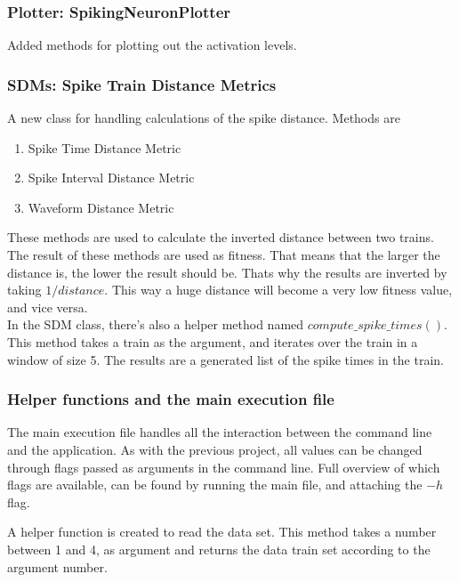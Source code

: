 \subsubsection{Plotter: SpikingNeuronPlotter}
Added methods for plotting out the activation levels. 


\subsubsection{SDMs: Spike Train Distance Metrics}
\label{sec:sdm}
A new class for handling calculations of the spike distance. Methods are 

\begin{enumerate}
	\item Spike Time Distance Metric
	\item Spike Interval Distance Metric
	\item Waveform Distance Metric
\end{enumerate}

These methods are used to calculate the inverted distance between two trains. The result of these
methods are used as fitness. That means that the larger the distance is, the lower the result should be.
Thats why the results are inverted by taking $1/distance$. This way a huge distance will become a very
low fitness value, and vice versa.  \\

In the SDM class, there's also a helper method named $compute\_spike\_times()$. This method
takes a train as the argument, and iterates over the train in a window of size 5. The results
are a generated list of the spike times in the train. 

\subsubsection{Helper functions and the main execution file}

The main execution file handles all the interaction between the command line and the application. As
with the previous project, all values can be changed through flags passed as arguments in the command
line. Full overview of which flags are available, can be found by running the main file, and attaching the $-h$ flag. 

A helper function is created to read the data set. This method takes a number between 1 and 4, as argument and 
returns the data train set according to the argument number. \\

